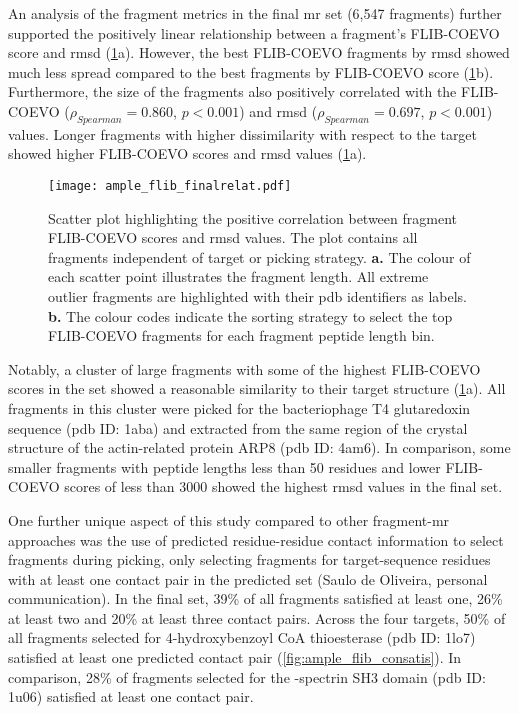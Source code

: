 An analysis of the fragment metrics in the final \gls{mr} set (6,547 fragments) further supported the positively linear relationship between a fragment's FLIB-COEVO score and \gls{rmsd} (\cref{fig:ample_flib_finalrelat}a). However, the best FLIB-COEVO fragments by \gls{rmsd} showed much less spread compared to the best fragments by FLIB-COEVO score (\cref{fig:ample_flib_finalrelat}b). Furthermore, the size of the fragments also positively correlated with the FLIB-COEVO ($\rho_{Spearman}=0.860$, $p<0.001$) and \gls{rmsd} ($\rho_{Spearman}=0.697$, $p<0.001$) values. Longer fragments with higher dissimilarity with respect to the target showed higher FLIB-COEVO scores and \gls{rmsd} values (\cref{fig:ample_flib_finalrelat}a). 

\begin{figure}[H]
	\centering
	\texttt{[image: ample\_flib\_finalrelat.pdf]}
        \caption[Correlation analysis for FLIB-COEVO MR fragments]{Scatter plot highlighting the positive correlation between fragment FLIB-COEVO scores and \gls{rmsd} values. The plot contains all fragments independent of target or picking strategy. \textbf{a.} The colour of each scatter point illustrates the fragment length. All extreme outlier fragments are highlighted with their \gls{pdb} identifiers as labels. \textbf{b.} The colour codes indicate the sorting strategy to select the top FLIB-COEVO fragments for each fragment peptide length bin.}
	\label{fig:ample_flib_finalrelat}
\end{figure}

Notably, a cluster of large fragments with some of the highest FLIB-COEVO scores in the set showed a reasonable similarity to their target structure (\cref{fig:ample_flib_finalrelat}a). All fragments in this cluster were picked for the bacteriophage T4 glutaredoxin sequence (\gls{pdb} ID: 1aba) and extracted from the same region of the crystal structure of the actin-related protein ARP8 (\gls{pdb} ID: 4am6). In comparison, some smaller fragments with peptide lengths less than 50 residues and lower FLIB-COEVO scores of less than 3000 showed the highest \gls{rmsd} values in the final set.

One further unique aspect of this study compared to other fragment-\gls{mr} approaches was the use of predicted residue-residue contact information to select fragments during picking, only selecting fragments for target-sequence residues with at least one contact pair in the predicted set (Saulo de Oliveira, personal communication). In the final set, 39\% of all fragments satisfied at least one, 26\% at least two and 20\% at least three contact pairs. Across the four targets, 50\% of all fragments selected for 4-hydroxybenzoyl CoA thioesterase (\gls{pdb} ID: 1lo7) satisfied at least one predicted contact pair (\cref{fig:ample_flib_consatis}). In comparison, 28\% of fragments selected for the \textalpha-spectrin SH3 domain (\gls{pdb} ID: 1u06) satisfied at least one contact pair.

